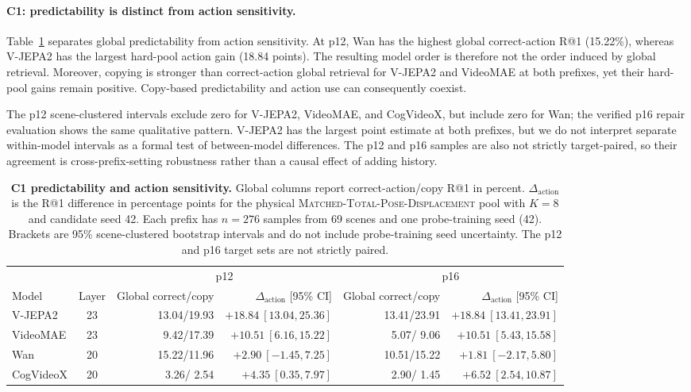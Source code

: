 \paragraph{C1: predictability is distinct from action sensitivity.}
Table~\ref{tab:probe-validity-c1} separates global predictability from action
sensitivity.  At p12, Wan has the highest global correct-action R@1 (15.22\%),
whereas V-JEPA2 has the largest hard-pool action gain (18.84 points).  The
resulting model order is therefore not the order induced by global retrieval.
Moreover, copying is stronger than correct-action global retrieval for
V-JEPA2 and VideoMAE at both prefixes, yet their hard-pool gains remain
positive.  Copy-based predictability and action use can consequently coexist.

The p12 scene-clustered intervals exclude zero for V-JEPA2, VideoMAE, and
CogVideoX, but include zero for Wan; the verified p16 repair evaluation
shows the same qualitative pattern.  V-JEPA2 has the largest point estimate at
both prefixes, but we do not interpret separate within-model intervals as a
formal test of between-model differences.  The p12 and p16 samples are also
not strictly target-paired, so their agreement is cross-prefix-setting
robustness rather than a causal effect of adding history.

\begin{table}[t]
  \centering
  \caption{\textbf{C1 predictability and action sensitivity.} Global columns
  report correct-action/copy R@1 in percent.  $\Delta_{\mathrm{action}}$ is the
  R@1 difference in percentage points for the physical
  \textsc{Matched-Total-Pose-Displacement} pool with $K=8$ and candidate seed
  42.  Each prefix has $n=276$ samples from 69 scenes and one probe-training
  seed (42).  Brackets are 95\% scene-clustered bootstrap intervals and do not
  include probe-training seed uncertainty.  The p12 and p16 target sets are not
  strictly paired.}
  \label{tab:probe-validity-c1}
  \small
  \setlength{\tabcolsep}{4.5pt}
  \begin{tabular}{@{}lcrrrr@{}}
    \toprule
    & & \multicolumn{2}{c}{p12} & \multicolumn{2}{c}{p16} \\
    \cmidrule(lr){3-4}\cmidrule(l){5-6}
    Model & Layer & Global correct/copy & $\Delta_{\mathrm{action}}$ [95\% CI] &
      Global correct/copy & $\Delta_{\mathrm{action}}$ [95\% CI] \\
    \midrule
    V-JEPA2   & 23 & 13.04/19.93 & $+18.84\ [13.04,25.36]$ & 13.41/23.91 & $+18.84\ [13.41,23.91]$ \\
    VideoMAE  & 23 &  9.42/17.39 & $+10.51\ [ 6.16,15.22]$ &  5.07/ 9.06 & $+10.51\ [ 5.43,15.58]$ \\
    Wan       & 20 & 15.22/11.96 & $ +2.90\ [-1.45, 7.25]$ & 10.51/15.22 & $ +1.81\ [-2.17, 5.80]$ \\
    CogVideoX & 20 &  3.26/ 2.54 & $ +4.35\ [ 0.35, 7.97]$ &  2.90/ 1.45 & $ +6.52\ [ 2.54,10.87]$ \\
    \bottomrule
  \end{tabular}
\end{table}

